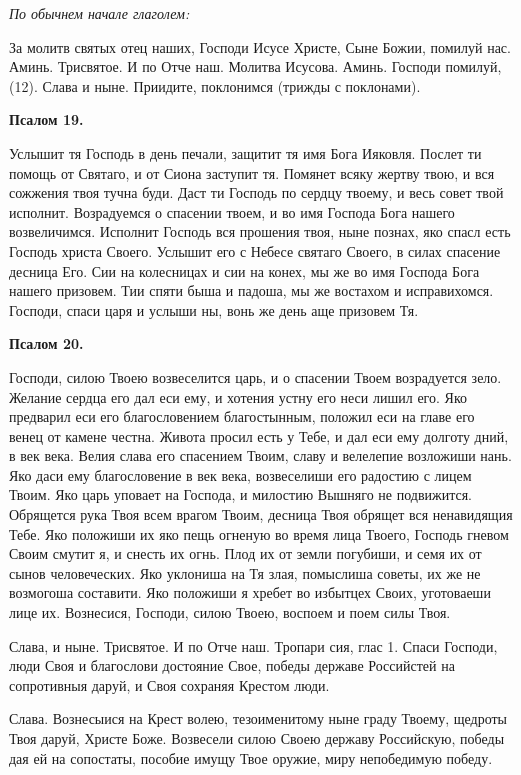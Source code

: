 \itshape По обычнем начале глаголем:\normalfont{}


За молитв святых отец наших, Господи Исусе Христе, Сыне Божии, помилуй нас. Аминь. Трисвятое. И по Отче наш. Молитва Исусова. Аминь. Господи помилуй, (12). Слава и ныне. Приидите, поклонимся (трижды с поклонами).


\medskip


\bfseries Псалом 19.\normalfont{}\nopagebreak


Услышит тя Господь в день печали, защитит тя имя Бога Ияковля. Послет ти помощь от Святаго, и от Сиона заступит тя. Помянет всяку жертву твою, и вся сожжения твоя тучна буди. Даст ти Господь по сердцу твоему, и весь совет твой исполнит. Возрадуемся о спасении твоем, и во имя Господа Бога нашего возвеличимся. Исполнит Господь вся прошения твоя, ныне познах, яко спасл есть Господь христа Своего. Услышит его с Небесе святаго Своего, в силах спасение десница Его. Сии на колесницах и сии на конех, мы же во имя Господа Бога нашего призовем. Тии спяти быша и падоша, мы же востахом и исправихомся. Господи, спаси царя и услыши ны, вонь же день аще призовем Тя. 


\medskip


\bfseries Псалом 20.\normalfont{}\nopagebreak


Господи, силою Твоею возвеселится царь, и о спасении Твоем возрадуется зело. Желание сердца его дал еси ему, и хотения устну его неси лишил его. Яко предварил еси его благословением благостынным, положил еси на главе его венец от камене честна. Живота просил есть у Тебе, и дал еси ему долготу дний, в век века. Велия слава его спасением Твоим, славу и велелепие возложиши нань. Яко даси ему благословение в век века, возвеселиши его радостию с лицем Твоим. Яко царь уповает на Господа, и милостию Вышняго не подвижится. Обрящется рука Твоя всем врагом Твоим, десница Твоя обрящет вся ненавидящия Тебе. Яко положиши их яко пещь огненую во время лица Твоего, Господь гневом Своим смутит я, и снесть их огнь. Плод их от земли погубиши, и семя их от сынов человеческих. Яко уклониша на Тя злая, помыслиша советы, их же не возмогоша составити. Яко положиши я хребет во избытцех Своих, уготоваеши лице их. Вознесися, Господи, силою Твоею, воспоем и поем силы Твоя. 

Слава, и ныне. Трисвятое. И по Отче наш. Тропари сия, глас 1. Спаси Господи, люди Своя и благослови достояние Свое, победы державе Российстей на сопротивныя даруй, и Своя сохраняя Крестом люди.

Слава. Вознесыися на Крест волею, тезоименитому ныне граду Твоему, щедроты Твоя даруй, Христе Боже. Возвесели силою Своею державу Российскую, победы дая ей на сопостаты, пособие имущу Твое оружие, миру непобедимую победу.

